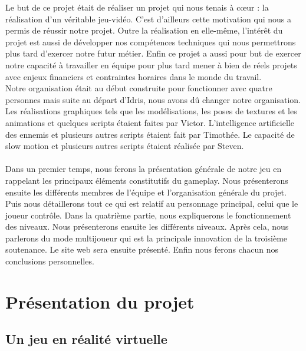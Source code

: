 \documentclass[12pt]{article}
\begin{document}
Le but de ce projet était de réaliser un projet qui nous tenais à cœur : la réalisation d'un véritable jeu-vidéo. C'est d'ailleurs cette motivation qui nous a permis de réussir notre projet. Outre la réalisation en elle-même, l'intérêt du projet est aussi de développer nos compétences techniques qui nous permettrons plus tard d'exercer notre futur métier. Enfin ce projet a aussi pour but de exercer notre capacité à travailler en équipe pour plus tard mener à bien de réels projets avec enjeux financiers et contraintes horaires dans le monde du travail.\\
Notre organisation était au début construite pour fonctionner avec quatre personnes mais suite au départ d'Idris, nous avons dû changer notre organisation. Les réalisations graphiques tels que les modélisations, les poses de textures et les animations et quelques scripts étaient faites par Victor. L'intelligence artificielle des ennemis et plusieurs autres scripts étaient fait par Timothée. Le capacité de slow motion et plusieurs autres scripts étaient réalisée par Steven.\\\\

Dans un premier temps, nous ferons la présentation générale de notre jeu en rappelant les principaux éléments constitutifs du gameplay. Nous présenterons ensuite les différents membres de l'équipe et l'organisation générale du projet. Puis nous détaillerons tout ce qui est relatif au personnage principal, celui que le joueur contrôle. Dans la quatrième partie, nous expliquerons le fonctionnement des niveaux. Nous présenterons ensuite les différents niveaux. Après cela, nous parlerons du mode multijoueur qui est la principale innovation de la troisième soutenance. Le site web sera ensuite présenté. Enfin nous ferons chacun nos conclusions personnelles.


\newpage

\renewcommand{\contentsname}{Sommaire}
\tableofcontents

\newpage

\section{Présentation du projet}

\subsection{Un jeu en réalité virtuelle}
\end{document}
